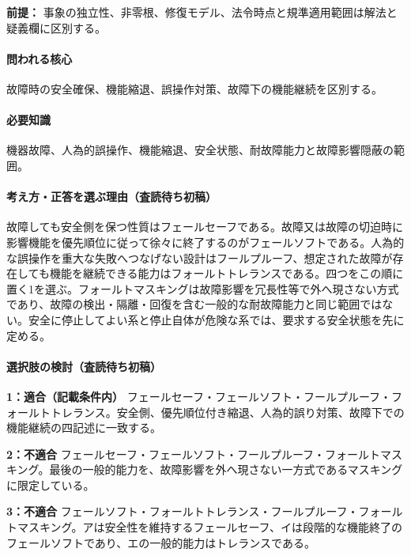 \noindent\textbf{前提：} 事象の独立性、非零根、修復モデル、法令時点と規準適用範囲は解法と疑義欄に区別する。\par

\paragraph{問われる核心} 故障時の安全確保、機能縮退、誤操作対策、故障下の機能継続を区別する。

\paragraph{必要知識} 機器故障、人為的誤操作、機能縮退、安全状態、耐故障能力と故障影響隠蔽の範囲。

\paragraph{考え方・正答を選ぶ理由（査読待ち初稿）} 故障しても安全側を保つ性質はフェールセーフである。故障又は故障の切迫時に影響機能を優先順位に従って徐々に終了するのがフェールソフトである。人為的な誤操作を重大な失敗へつなげない設計はフールプルーフ、想定された故障が存在しても機能を継続できる能力はフォールトトレランスである。四つをこの順に置く1を選ぶ。フォールトマスキングは故障影響を冗長性等で外へ現さない方式であり、故障の検出・隔離・回復を含む一般的な耐故障能力と同じ範囲ではない。安全に停止してよい系と停止自体が危険な系では、要求する安全状態を先に定める。

\paragraph{選択肢の検討（査読待ち初稿）}\mbox{}\par

\noindent\textbf{1：適合（記載条件内）} フェールセーフ・フェールソフト・フールプルーフ・フォールトトレランス。安全側、優先順位付き縮退、人為的誤り対策、故障下での機能継続の四記述に一致する。\par

\noindent\textbf{2：不適合} フェールセーフ・フェールソフト・フールプルーフ・フォールトマスキング。最後の一般的能力を、故障影響を外へ現さない一方式であるマスキングに限定している。\par

\noindent\textbf{3：不適合} フェールソフト・フォールトトレランス・フールプルーフ・フォールトマスキング。アは安全性を維持するフェールセーフ、イは段階的な機能終了のフェールソフトであり、エの一般的能力はトレランスである。\par

